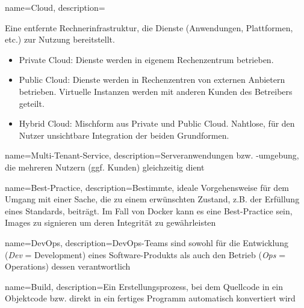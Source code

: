 



{%
  name={Cloud},
  description={Eine entfernte Rechnerinfrastruktur, die Dienste (Anwendungen, Plattformen, etc.) zur Nutzung bereitstellt.
    \begin{itemize}
      \item Private Cloud: Dienste werden in eigenem Rechenzentrum betrieben.
      \item Public Cloud: Dienste werden in Rechenzentren von externen Anbietern betrieben. Virtuelle Instanzen werden mit anderen Kunden des Betreibers geteilt.
      \item Hybrid Cloud: Mischform aus Private und Public Cloud. Nahtlose, für den Nutzer unsichtbare Integration der beiden Grundformen.
    \end{itemize}%
  }
}

{%
  name={Multi-Tenant-Service},
  description={Serveranwendungen bzw. -umgebung, die mehreren Nutzern (ggf. Kunden) gleichzeitig dient}
}

{%
  name={Best-Practice},
  description={Bestimmte, ideale Vorgehensweise für dem Umgang mit einer Sache, die zu einem erwünschten Zustand, z.B. der Erfüllung eines Standards, beiträgt. Im Fall von Docker kann es eine Best-Practice sein, Images zu signieren um deren Integrität zu gewährleisten}
}

{%
  name={DevOps},
  description={DevOps-Teams sind sowohl für die Entwicklung (\emph{Dev} = Development) eines Software-Produkts als auch den Betrieb (\emph{Ops} = Operations) dessen verantwortlich}
}

{%
  name={Build},
  description={Ein Erstellungsprozess, bei dem Quellcode in ein Objektcode bzw. direkt in ein fertiges Programm automatisch konvertiert wird}
}

